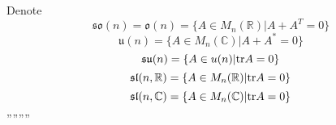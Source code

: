 Denote  \[\mathfrak{so}(n)=\mathfrak{o}(n)=\{A\in M_n(\mathbb{R})|A+A^T=0\} \]
\[\mathfrak{u}(n)=\{A\in M_n(\mathbb{C})|A+A^*=0\}\]
\[\mathfrak{su}(n)=\{A\in u(n)|\mathrm{tr} A=0\}\]
\[\mathfrak{sl}(n,\mathbb{R})=\{A\in M_n(\mathbb{R})|\mathrm{tr} A=0\}\]
\[\mathfrak{sl}(n,\mathbb{C})=\{A\in M_n(\mathbb{C})|\mathrm{tr} A=0\}\]
''''''''